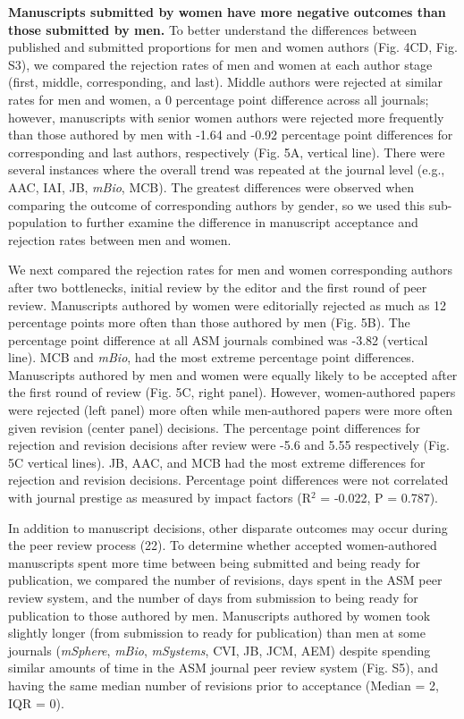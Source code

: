 \documentclass[11pt,]{article}
\begin{document}
\textbf{Manuscripts submitted by women have more negative outcomes than
those submitted by men.} To better understand the differences between
published and submitted proportions for men and women authors (Fig. 4CD,
Fig. S3), we compared the rejection rates of men and women at each
author stage (first, middle, corresponding, and last). Middle authors
were rejected at similar rates for men and women, a 0 percentage point
difference across all journals; however, manuscripts with senior women
authors were rejected more frequently than those authored by men with
-1.64 and -0.92 percentage point differences for corresponding and last
authors, respectively (Fig. 5A, vertical line). There were several
instances where the overall trend was repeated at the journal level
(e.g., AAC, IAI, JB, \emph{mBio}, MCB). The greatest differences were
observed when comparing the outcome of corresponding authors by gender,
so we used this sub-population to further examine the difference in
manuscript acceptance and rejection rates between men and women.

We next compared the rejection rates for men and women corresponding
authors after two bottlenecks, initial review by the editor and the
first round of peer review. Manuscripts authored by women were
editorially rejected as much as 12 percentage points more often than
those authored by men (Fig. 5B). The percentage point difference at all
ASM journals combined was -3.82 (vertical line). MCB and \emph{mBio},
had the most extreme percentage point differences. Manuscripts authored
by men and women were equally likely to be accepted after the first
round of review (Fig. 5C, right panel). However, women-authored papers
were rejected (left panel) more often while men-authored papers were
more often given revision (center panel) decisions. The percentage point
differences for rejection and revision decisions after review were -5.6
and 5.55 respectively (Fig. 5C vertical lines). JB, AAC, and MCB had the
most extreme differences for rejection and revision decisions.
Percentage point differences were not correlated with journal prestige
as measured by impact factors (R\({^2}\) = -0.022, P = 0.787).

In addition to manuscript decisions, other disparate outcomes may occur
during the peer review process (22). To determine whether accepted
women-authored manuscripts spent more time between being submitted and
being ready for publication, we compared the number of revisions, days
spent in the ASM peer review system, and the number of days from
submission to being ready for publication to those authored by men.
Manuscripts authored by women took slightly longer (from submission to
ready for publication) than men at some journals (\emph{mSphere},
\emph{mBio}, \emph{mSystems}, CVI, JB, JCM, AEM) despite spending
similar amounts of time in the ASM journal peer review system (Fig. S5),
and having the same median number of revisions prior to acceptance
(Median = 2, IQR = 0).
\end{document}
